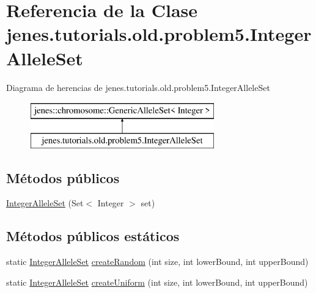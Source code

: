 \hypertarget{classjenes_1_1tutorials_1_1old_1_1problem5_1_1_integer_allele_set}{\section{Referencia de la Clase jenes.\-tutorials.\-old.\-problem5.\-Integer\-Allele\-Set}
\label{classjenes_1_1tutorials_1_1old_1_1problem5_1_1_integer_allele_set}
}
Diagrama de herencias de jenes.\-tutorials.\-old.\-problem5.\-Integer\-Allele\-Set\begin{figure}[H]
\begin{center}
\leavevmode
\includegraphics[height=2.000000cm]{classjenes_1_1tutorials_1_1old_1_1problem5_1_1_integer_allele_set}
\end{center}
\end{figure}
\subsection*{Métodos públicos}
\begin{DoxyCompactItemize}
\item 
\hyperlink{classjenes_1_1tutorials_1_1old_1_1problem5_1_1_integer_allele_set_a4bf775d640641b83dd1c53564b00f263}{Integer\-Allele\-Set} (Set$<$ Integer $>$ set)
\end{DoxyCompactItemize}
\subsection*{Métodos públicos estáticos}
\begin{DoxyCompactItemize}
\item 
static \hyperlink{classjenes_1_1tutorials_1_1old_1_1problem5_1_1_integer_allele_set}{Integer\-Allele\-Set} \hyperlink{classjenes_1_1tutorials_1_1old_1_1problem5_1_1_integer_allele_set_aab816bbf2219835d788ceb8b8a92007c}{create\-Random} (int size, int lower\-Bound, int upper\-Bound)
\item 
static \hyperlink{classjenes_1_1tutorials_1_1old_1_1problem5_1_1_integer_allele_set}{Integer\-Allele\-Set} \hyperlink{classjenes_1_1tutorials_1_1old_1_1problem5_1_1_integer_allele_set_af952e89dffc31630da0371be73bae906}{create\-Uniform} (int size, int lower\-Bound, int upper\-Bound)
\end{DoxyCompactItemize}


